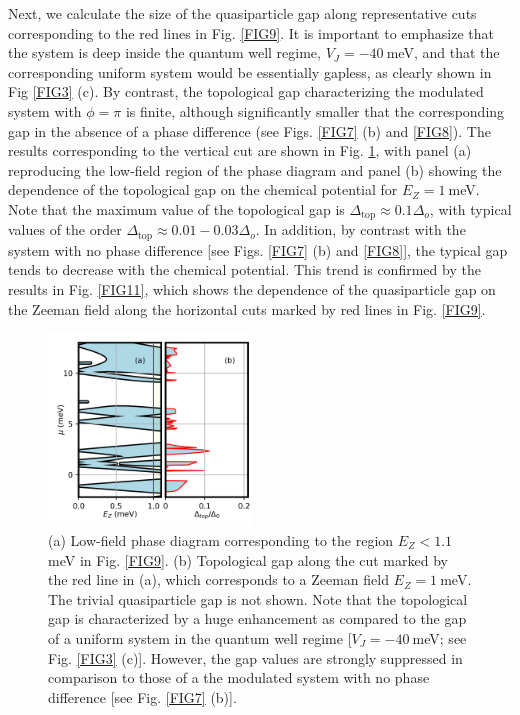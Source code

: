 \documentclass[twocolumn,aps,prb,nofootinbib]{revtex4-2}
\begin{document}
Next, we calculate the size of the quasiparticle gap along representative cuts corresponding to the red lines in Fig. \ref{FIG9}.
It is important to emphasize that the system is deep inside the quantum well regime, $V_J=-40~$meV, and that the corresponding uniform system  would be essentially gapless,  as clearly shown in Fig \ref{FIG3} (c). By contrast, the topological gap characterizing the modulated system with $\phi=\pi$  is finite, although significantly smaller that the corresponding gap in the absence of a phase difference (see Figs. \ref{FIG7} (b)  and \ref{FIG8}).
The results corresponding to the vertical cut are shown in Fig. \ref{FIG10}, with panel (a) reproducing the low-field region of the phase diagram and panel (b) showing the dependence of the topological gap on the chemical potential for $E_Z=1~$meV.
Note that the maximum  value of the topological gap is $\Delta_{\text{top}} \approx 0.1\Delta_o$, with typical values of the order  
 $\Delta_{\text{top}} \approx 0.01 - 0.03 \Delta_o$. In addition, by contrast with the system with no phase difference [see Figs. \ref{FIG7} (b)  and \ref{FIG8}], the typical gap tends to decrease with the chemical potential.  This  trend is confirmed by the results in Fig. \ref{FIG11}, which shows the dependence of the quasiparticle gap on the Zeeman field along the horizontal cuts marked by red lines in Fig. \ref{FIG9}. 
 
\begin{figure}[t]
\begin{center}
\includegraphics[width=0.48\textwidth]{Fig10.png}
\end{center}
\vspace{-3mm}
\caption{(a) Low-field phase diagram corresponding to the region $E_Z < 1.1~$meV in Fig. \ref{FIG9}. (b) Topological gap along the cut marked by the red line in (a), which corresponds to a Zeeman field $E_Z=1~$meV. The trivial quasiparticle gap is not shown. Note that the topological gap is characterized by a huge enhancement as compared to the gap of a uniform system in the quantum well regime [$V_J = -40~$meV; see Fig. \ref{FIG3} (c)]. However, the gap values are strongly suppressed in comparison to those of a the modulated system with no phase difference [see Fig. \ref{FIG7} (b)].}
\label{FIG10}
\vspace{-3mm}
\end{figure}
\end{document}
